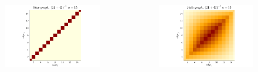 \documentclass{beamer}
\begin{document}
\begin{frame}

    \begin{columns}
        \begin{column}{.46\textwidth}
            \begin{figure}
                \includegraphics[width = \linewidth]{../../plots/bargmatrices/star.png}
            \end{figure}
        \end{column}

        \hfill

        \begin{column}{.46\textwidth}
            \begin{figure}
                \includegraphics[width = \linewidth]{../../plots/bargmatrices/path.png}
            \end{figure}
        \end{column}
    \end{columns}


\end{frame}
\end{document}

